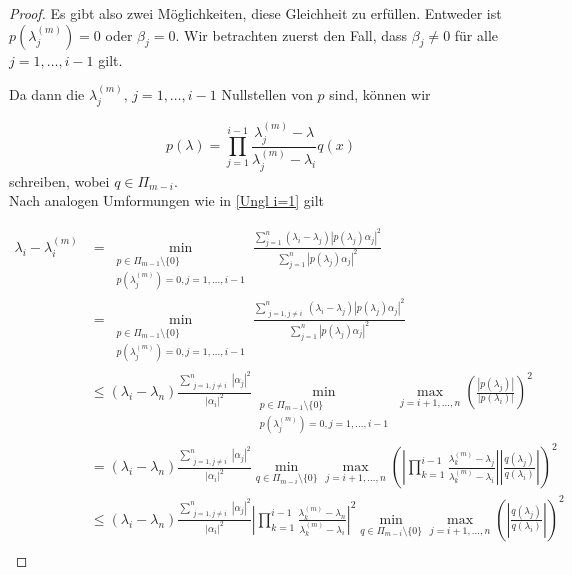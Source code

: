 \documentclass{article}
\begin{document}
\begin{theorem}
\begin{proof}
	Es gibt also zwei Möglichkeiten, diese Gleichheit zu erfüllen. Entweder ist $p(\lambda_j^{(m)}) = 0$ oder $\beta_j = 0$. Wir betrachten zuerst den Fall, dass  $\beta_j \neq 0$ für alle $j = 1,\dots, i-1$ gilt.

	Da dann die $\lambda_j^{(m)}, \, j = 1,\dots,i-1$ Nullstellen von $p$ sind, können wir

	\begin{equation*}
		p(\lambda) = \prod_{j = 1}^{i-1} \frac{\lambda_j^{(m)} -\lambda}{\lambda_j^{(m)} - \lambda_i} q(x)
	\end{equation*}
	schreiben, wobei $q \in \Pi_{m-i}$.\\

	Nach analogen Umformungen wie in \ref{Ungl i=1} gilt

	\begin{equation*}
		\begin{aligned}
			\lambda_i - \lambda_i^{(m)} &= \min_{\substack{p\in \Pi_{m-1}\setminus \{0\} \\ p(\lambda_j^{(m)}) = 0, j = 1,\dots,i-1}} \frac{\sum_{j=1}^{n} (\lambda_i - \lambda_j)|p(\lambda_j)\alpha_j|^2}{\sum_{j=1}^{n} |p(\lambda_j)\alpha_j|^2} \\
			&= \min_{\substack{p\in \Pi_{m-1}\setminus \{0\} \\ p(\lambda_j^{(m)}) = 0, j = 1,\dots,i-1}} \frac{\sum_{\substack{j=1, j\neq i}}^{n} (\lambda_i - \lambda_j)|p(\lambda_j)\alpha_j|^2}{\sum_{j=1}^{n} |p(\lambda_j)\alpha_j|^2} \\
			& \le (\lambda_i - \lambda_n) \frac{\sum_{\substack{j=1, j\neq i}}^{n} |\alpha_j|^2}{|\alpha_i|^2} \min_{\substack{p\in \Pi_{m-1}\setminus \{0\} \\ p(\lambda_j^{(m)}) = 0, j = 1,\dots,i-1}} \max_{j=i+1,\dots,n} \left(\frac{|p(\lambda_j)|}{|p(\lambda_i)|}\right)^2 \\
			&= (\lambda_i - \lambda_n) \frac{\sum_{\substack{j=1, j\neq i}}^{n} |\alpha_j|^2}{|\alpha_i|^2} \min_{q\in \Pi_{m-i}\setminus \{0\}} \max_{j=i+1,\dots,n} \left(\left|\prod_{k = 1}^{i-1} \frac{\lambda_k^{(m)} -\lambda_j}{\lambda_k^{(m)} - \lambda_i}\right| \left|\frac{q(\lambda_j)}{q(\lambda_i)}\right|\right)^2 \\
			&\le (\lambda_i - \lambda_n) \frac{\sum_{\substack{j=1, j\neq i}}^{n} |\alpha_j|^2}{|\alpha_i|^2} \left|\prod_{k = 1}^{i-1} \frac{\lambda_k^{(m)} -\lambda_n}{\lambda_k^{(m)} - \lambda_i}\right|^2 \min_{q\in \Pi_{m-i}\setminus \{0\}} \max_{j=i+1,\dots,n} \left(\left|\frac{q(\lambda_j)}{q(\lambda_i)}\right|\right)^2 \\
		\end{aligned}
	\end{equation*}


\end{proof}
\end{theorem}
\end{document}
